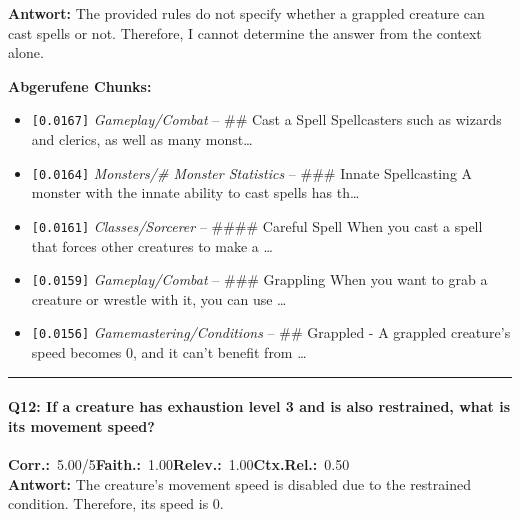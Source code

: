 \noindent\textbf{Antwort:} The provided rules do not specify whether a grappled creature can cast spells or not. Therefore, I cannot determine the answer from the context alone.

\noindent\textbf{Abgerufene Chunks:}
\begin{itemize}[noitemsep, topsep=2pt]
  \item[\textbf{\#1}] \texttt{[0.0167]} \textit{Gameplay/Combat} -- \#\# Cast a Spell  Spellcasters such as wizards and clerics, as well as many monst\ldots
  \item[\textbf{\#2}] \texttt{[0.0164]} \textit{Monsters/# Monster Statistics} -- \#\#\# Innate Spellcasting  A monster with the innate ability to cast spells has th\ldots
  \item[\textbf{\#3}] \texttt{[0.0161]} \textit{Classes/Sorcerer} -- \#\#\#\# Careful Spell  When you cast a spell that forces other creatures to make a \ldots
  \item[\textbf{\#4}] \texttt{[0.0159]} \textit{Gameplay/Combat} -- \#\#\# Grappling  When you want to grab a creature or wrestle with it, you can use \ldots
  \item[\textbf{\#5}] \texttt{[0.0156]} \textit{Gamemastering/Conditions} -- \#\# Grappled  - A grappled creature's speed becomes 0, and it can't benefit from \ldots
\end{itemize}
\vspace{4pt}
\hrule
\vspace{6pt}

\paragraph{Q12: If a creature has exhaustion level 3 and is also restrained, what is its movement speed?}
\noindent \textbf{Corr.:}~5.00/5\quad \textbf{Faith.:}~1.00\quad \textbf{Relev.:}~1.00\quad \textbf{Ctx.Rel.:}~0.50\\

\noindent\textbf{Antwort:} The creature's movement speed is disabled due to the restrained condition. Therefore, its speed is 0.

